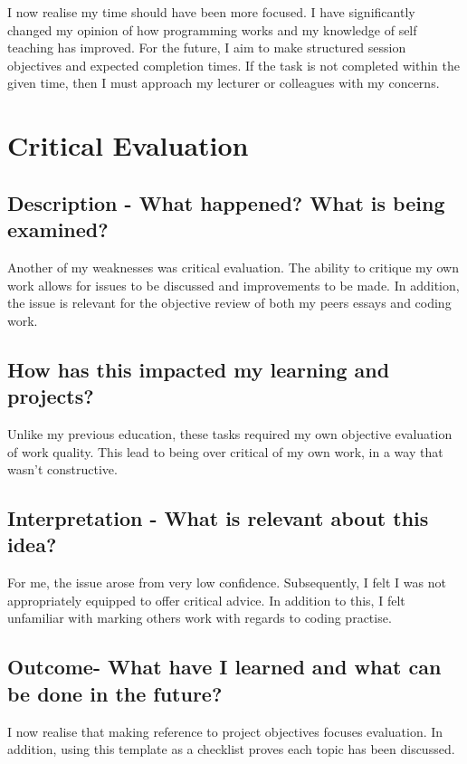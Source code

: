 \documentclass{scrartcl}
\begin{document}
I now realise my time should have been more focused. I have significantly changed my opinion of how programming works and my knowledge of self teaching has improved. For the future, I aim to make structured session objectives and expected completion times. If the task is not completed within the given time, then I must approach my lecturer or colleagues with my concerns.

\section{Critical Evaluation}

\subsection{Description - What happened? What is being examined?}

Another of my weaknesses was critical evaluation. The ability to critique my own work allows for issues to be discussed and improvements to be made. In addition, the issue is relevant for the objective review of both my peers essays and coding work.

\subsection{How has this impacted my learning and projects?}

Unlike my previous education, these tasks required my own objective evaluation of work quality. This lead to being over critical of my own work, in a way that wasn't constructive.

\subsection{Interpretation - What is relevant about this idea?}

For me, the issue arose from very low confidence. Subsequently, I felt I was not appropriately equipped to offer critical advice. In addition to this, I felt unfamiliar with marking others work with regards to coding practise.

\subsection{Outcome- What have I learned and what can be done in the future?}

I now realise that making reference to project objectives focuses evaluation. In addition, using this template as a checklist proves each topic has been discussed.
\end{document}

